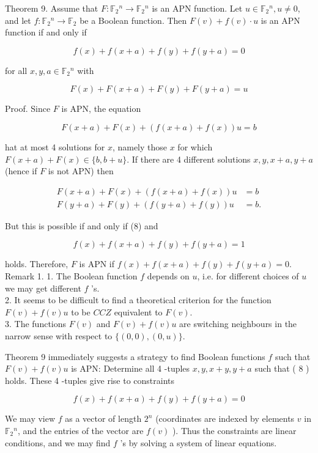\documentclass[10pt]{article}
\begin{document}
Theorem 9. Assume that $F: \mathbb{F}_{2}{ }^{n} \rightarrow \mathbb{F}_{2}{ }^{n}$ is an APN function. Let $u \in \mathbb{F}_{2}{ }^{n}, u \neq 0$, and let $f: \mathbb{F}_{2}{ }^{n} \rightarrow \mathbb{F}_{2}$ be a Boolean function. Then $F(v)+f(v) \cdot u$ is an APN function if and only if

$$
f(x)+f(x+a)+f(y)+f(y+a)=0
$$

for all $x, y, a \in \mathbb{F}_{2}{ }^{n}$ with


\begin{equation*}
F(x)+F(x+a)+F(y)+F(y+a)=u \tag{8}
\end{equation*}


Proof. Since $F$ is APN, the equation

$$
F(x+a)+F(x)+(f(x+a)+f(x)) u=b
$$

hat at most 4 solutions for $x$, namely those $x$ for which $F(x+a)+F(x) \in\{b, b+u\}$. If there are 4 different solutions $x, y, x+a, y+a$ (hence if $F$ is not APN) then

$$
\begin{aligned}
F(x+a)+F(x)+(f(x+a)+f(x)) u & =b \\
F(y+a)+F(y)+(f(y+a)+f(y)) u & =b .
\end{aligned}
$$

But this is possible if and only if (8) and

$$
f(x)+f(x+a)+f(y)+f(y+a)=1
$$

holds. Therefore, $F$ is APN if $f(x)+f(x+a)+f(y)+f(y+a)=0$.\\
Remark 1. 1. The Boolean function $f$ depends on $u$, i.e. for different choices of $u$ we may get different $f$ 's.\\
2. It seems to be difficult to find a theoretical criterion for the function $F(v)+f(v) u$ to be $C C Z$ equivalent to $F(v)$.\\
3. The functions $F(v)$ and $F(v)+f(v) u$ are switching neighbours in the narrow sense with respect to $\{(0,0),(0, u)\}$.

Theorem 9 immediately suggests a strategy to find Boolean functions $f$ such that $F(v)+f(v) u$ is APN: Determine all 4 -tuples $x, y, x+y, y+a$ such that ( 8 ) holds. These 4 -tuples give rise to constraints

$$
f(x)+f(x+a)+f(y)+f(y+a)=0
$$

We may view $f$ as a vector of length $2^{n}$ (coordinates are indexed by elements $v$ in $\mathbb{F}_{2}{ }^{n}$, and the entries of the vector are $f(v)$ ). Thus the constraints are linear conditions, and we may find $f$ 's by solving a system of linear equations.
\end{document}
